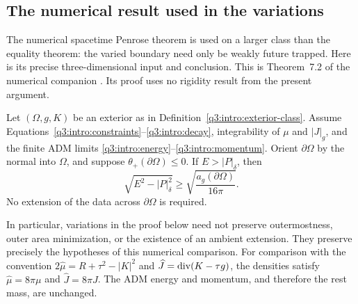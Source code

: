 \subsection{The numerical result used in the variations}

The numerical spacetime Penrose theorem is used on a larger class than
the equality theorem: the varied boundary need only be weakly future
trapped.  Here is its precise three-dimensional input and conclusion.
This is Theorem~7.2 of the numerical companion
\cite{CompanionNumerical}. Its proof uses no rigidity result from the
present argument.

\begin{proposition}\label{q3:intro:exterior-inequality}
Let \((\Omega,g,K)\) be an exterior as in
Definition~\ref{q3:intro:exterior-class}. Assume
Equations~\eqref{q3:intro:constraints}--\eqref{q3:intro:decay}, integrability
of \(\mu\) and \(|J|_g\), and the finite ADM limits
\eqref{q3:intro:energy}--\eqref{q3:intro:momentum}. Orient \(\partial\Omega\)
by the normal into \(\Omega\), and suppose
\(\theta_+(\partial\Omega)\le0\). If \(E>|P|_\delta\), then
\begin{equation}\label{q3:intro:penrose}
          \sqrt{E^2-|P|_\delta^2}
               \ge \sqrt{\frac{a_g(\partial\Omega)}{16\pi}}.
\end{equation}
No extension of the data across \(\partial\Omega\) is required.
\end{proposition}

In particular, variations in the proof below need not preserve
outermostness, outer area minimization, or the existence of an ambient
extension.  They preserve precisely the hypotheses of this numerical
comparison.  For comparison with the convention
$2\widehat\mu=R+\tau^2-|K|^2$ and
$\widehat J=\operatorname{div}(K-\tau g)$, the densities satisfy
$\widehat\mu=8\pi\mu$ and $\widehat J=8\pi J$.
The ADM energy and momentum, and therefore the rest mass, are unchanged.
